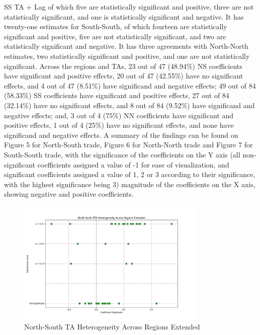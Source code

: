 \documentclass[12pt]{article}%
\begin{document}
SS TA + Lag of which five are statistically significant and positive,
three are not statistically significant, and one is statistically
significant and negative. It has twenty-one estimates for South-South,
of which fourteen are statistically significant and positive, five are
not statistically significant, and two are statistically significant and
negative. It has three agreements with North-North estimates, two
statistically significant and positive, and one are not statistically
significant. Across the regions and TAs, 23 out of 47 (48.94\%) NS
coefficients have significant and positive effects, 20 out of 47
(42.55\%) have no significant effects, and 4 out of 47 (8.51\%) have
significand and negative effects; 49 out of 84 (58.33\%) SS coefficients
have significant and positive effects, 27 out of 84 (32.14\%) have no
significant effects, and 8 out of 84 (9.52\%) have significand and
negative effects; and, 3 out of 4 (75\%) NN coefficients have
significant and positive effects, 1 out of 4 (25\%) have no significant
effects, and none have significand and negative effects. A summary of
the findings can be found on Figure 5 for North-South trade, Figure 6 for
North-North trade and Figure 7 for South-South trade, with the
significance of the coefficients on the Y axis (all non-significant
coefficients assigned a value of -1 for ease of visualization, and
significant coefficients assigned a value of 1, 2 or 3 according to
their significance, with the highest significance being 3) magnitude of
the coefficients on the X axis, showing negative and positive
coefficients.
%


\begin{figure}[h!]%
\centering%
\includegraphics[width=0.8\textwidth]{figures/North-South_trade_relationships_visualization.jpeg}%
\caption{North{-}South TA Heterogeneity Across Regions Extended}%
\end{figure}
\end{document}
